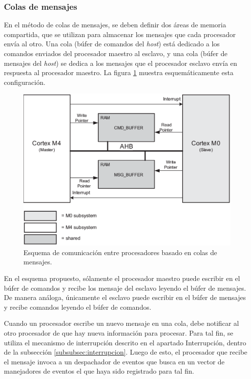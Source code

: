 \subsubsection{Colas de mensajes}
\label{subsubsec:colas}

En el método de colas de mensajes, se deben definir dos áreas de memoria compartida, que se utilizan para almacenar los mensajes que cada procesador envía al otro. Una cola (búfer de comandos del \textit{host}) está dedicado a los comandos enviados del procesador maestro al esclavo, y una cola (búfer de mensajes del \textit{host}) se dedica a los mensajes que el procesador esclavo envía en respuesta al procesador maestro. La figura \ref{fig:IPC} muestra esquemáticamente esta configuración.

\vspace{10px}

\begin{figure}[ht]
	\centering
	\includegraphics[width=.8\textwidth]{./Figures/IPC.png}
	\caption[Esquema de comunicación entre procesadores]{Esquema de comunicación entre procesadores basado en colas de mensajes\protect\footnotemark.}
	\label{fig:IPC}
\end{figure}

\vspace{10px}
\vfill
{}

En el esquema propuesto, sólamente el procesador maestro puede escribir en el búfer de comandos y recibe los mensaje del esclavo leyendo el búfer de mensajes.  De manera análoga, únicamente el esclavo puede escribir en el búfer de mensajes y recibe comandos leyendo el búfer de comandos.

Cuando un procesador escribe un nuevo mensaje en una cola, debe notificar al otro procesador de que hay nueva información para procesar. Para tal fin, se utiliza el mecanismo de interrupción descrito en el apartado Interrupción, dentro de la subsección \ref{subsubsec:interrupcion}.  Luego de esto, el procesador que recibe el mensaje invoca a un despachador de eventos que busca en un vector de manejadores de eventos el que haya sido registrado para tal fin.

